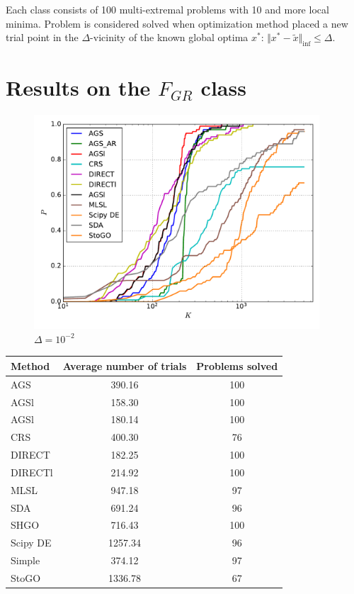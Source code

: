 \documentclass[a4paper]{article}
\begin{document}
Each class consists of 100 multi-extremal problems with 10 and more local minima. Problem is considered solved when optimization method placed a new trial point in the $\Delta$-vicinity of the known global optima $x^*$: $\Vert x^* - \widetilde{x} \Vert_{\inf} \le \Delta$.


\section{Results on the $F_{GR}$ class}

\begin{figure}[H]
  \center
  \includegraphics[width=0.95\textwidth]{../experiments/grish/cmc.pdf}
  \caption{$\Delta=10^{-2}$}
\end{figure}

\begin{tabular}{lcc}
\hline
 Method   &  Average number of trials  &  Problems solved  \\
\hline
 AGS      &           390.16           &        100        \\
 AGSl     &           158.30           &        100        \\
 AGSl     &           180.14           &        100        \\
 CRS      &           400.30           &        76         \\
 DIRECT   &           182.25           &        100        \\
 DIRECTl  &           214.92           &        100        \\
 MLSL     &           947.18           &        97         \\
 SDA      &           691.24           &        96         \\
 SHGO     &           716.43           &        100        \\
 Scipy DE &          1257.34           &        96         \\
 Simple   &           374.12           &        97         \\
 StoGO    &          1336.78           &        67         \\
\hline
\end{tabular}
\end{document}
